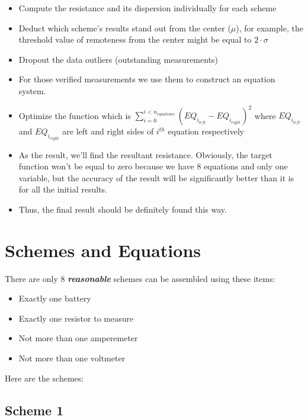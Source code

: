 \documentclass[11pt]{memoir}
\begin{document}
        \begin{itemize}
            \item Compute the resistance and its dispersion individually for each scheme
            \item Deduct which scheme's results stand out from the center ($\mu$), for example, the threshold value of remoteness from the center might be equal to $2 \cdot \sigma$
            \item Dropout the data outliers (outstanding measurements)
            \item For those verified measurements we use them to construct an equation system.
            \item Optimize the function which is ${\sum_{i=0}^{i<n_{equations}} \left(EQ_{i_{left}} - EQ_{i_{right}}\right) ^ 2}$\newline
                where $EQ_{i_{left}}$ and $EQ_{i_{right}}$ are left and right sides of $i^{th}$ equation respectively
            \item \label{itm:low-dispersion} As the result, we'll find the resultant resistance.\newline
            Obviously, the target function won't be equal to zero because we have 8 equations and only one variable, but the accuracy of the result will be significantly better than it is for all the initial results.
            \item Thus, the final result should be definitely found this way.
        \end{itemize}

    \section{Schemes and Equations}\label{sec:schemes-and-equations}
        There are only 8 \textit{\textbf{reasonable}} schemes can be assembled using these items:
        \begin{itemize}
            \item Exactly one battery
            \item Exactly one resistor to measure
            \item Not more than one amperemeter
            \item Not more than one voltmeter
        \end{itemize}

        Here are the schemes:

    \subsection{Scheme 1}\label{subsec:scheme-1}
\end{document}
